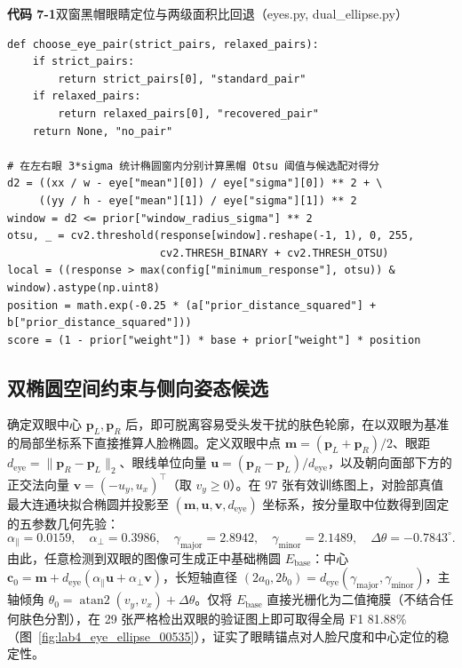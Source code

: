 \noindent\textbf{代码 7-1}\quad 双窗黑帽眼睛定位与两级面积比回退（eyes.py, dual\_ellipse.py）
\begin{lstlisting}
def choose_eye_pair(strict_pairs, relaxed_pairs):
    if strict_pairs:
        return strict_pairs[0], "standard_pair"
    if relaxed_pairs:
        return relaxed_pairs[0], "recovered_pair"
    return None, "no_pair"

# 在左右眼 3*sigma 统计椭圆窗内分别计算黑帽 Otsu 阈值与候选配对得分
d2 = ((xx / w - eye["mean"][0]) / eye["sigma"][0]) ** 2 + \
     ((yy / h - eye["mean"][1]) / eye["sigma"][1]) ** 2
window = d2 <= prior["window_radius_sigma"] ** 2
otsu, _ = cv2.threshold(response[window].reshape(-1, 1), 0, 255,
                        cv2.THRESH_BINARY + cv2.THRESH_OTSU)
local = ((response > max(config["minimum_response"], otsu)) & window).astype(np.uint8)
position = math.exp(-0.25 * (a["prior_distance_squared"] + b["prior_distance_squared"]))
score = (1 - prior["weight"]) * base + prior["weight"] * position
\end{lstlisting}

\subsection{双椭圆空间约束与侧向姿态候选}

确定双眼中心 $\mathbf{p}_L, \mathbf{p}_R$ 后，即可脱离容易受头发干扰的肤色轮廓，在以双眼为基准的局部坐标系下直接推算人脸椭圆。定义双眼中点 $\mathbf{m}=(\mathbf{p}_L+\mathbf{p}_R)/2$、眼距 $d_{\text{eye}}=\|\mathbf{p}_R-\mathbf{p}_L\|_2$、眼线单位向量 $\mathbf{u}=(\mathbf{p}_R-\mathbf{p}_L)/d_{\text{eye}}$，以及朝向面部下方的正交法向量 $\mathbf{v}=(-u_y, u_x)^\top$（取 $v_y\ge 0$）。在 97 张有效训练图上，对脸部真值最大连通块拟合椭圆并投影至 $(\mathbf{m}, \mathbf{u}, \mathbf{v}, d_{\text{eye}})$ 坐标系，按分量取中位数得到固定的五参数几何先验：
\begin{equation}
\alpha_\parallel = 0.0159,\quad
\alpha_\perp = 0.3986,\quad
\gamma_{\text{major}} = 2.8942,\quad
\gamma_{\text{minor}} = 2.1489,\quad
\Delta\theta = -0.7843^\circ.
\label{eq:geomprior}
\end{equation}
由此，任意检测到双眼的图像可生成正中基础椭圆 $E_{\text{base}}$：中心 $\mathbf{c}_0 = \mathbf{m} + d_{\text{eye}}(\alpha_\parallel\mathbf{u} + \alpha_\perp\mathbf{v})$，长短轴直径 $(2a_0, 2b_0) = d_{\text{eye}}(\gamma_{\text{major}}, \gamma_{\text{minor}})$，主轴倾角 $\theta_0 = \operatorname{atan2}(v_y, v_x) + \Delta\theta$。仅将 $E_{\text{base}}$ 直接光栅化为二值掩膜（不结合任何肤色分割），在 29 张严格检出双眼的验证图上即可取得全局 F1 81.88\%（图~\ref{fig:lab4_eye_ellipse_00535}），证实了眼睛锚点对人脸尺度和中心定位的稳定性。

